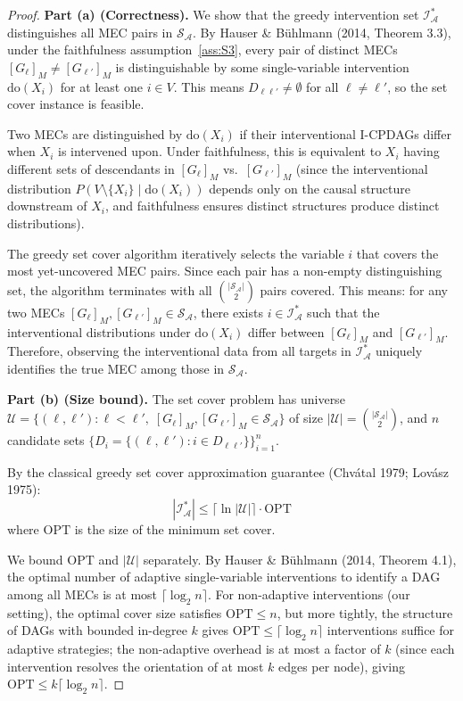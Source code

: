 \documentclass{article}
\theoremstyle{definition}
\theoremstyle{plain}
\theoremstyle{remark}
\begin{document}
\begin{proof}
\textbf{Part (a) (Correctness).}
We show that the greedy intervention set $\mathcal{I}^*_\mathcal{A}$ distinguishes all
MEC pairs in $\mathcal{S}_\mathcal{A}$. By Hauser \& Bühlmann (2014, Theorem 3.3),
under the faithfulness assumption~\ref{ass:S3}, every pair of distinct MECs $[G_\ell]_M
\neq [G_{\ell'}]_M$ is distinguishable by some single-variable intervention
$\mathrm{do}(X_i)$ for at least one $i \in V$. This means $D_{\ell\ell'} \neq \emptyset$
for all $\ell \neq \ell'$, so the set cover instance is feasible.

Two MECs are distinguished by $\mathrm{do}(X_i)$ if their interventional I-CPDAGs differ
when $X_i$ is intervened upon. Under faithfulness, this is equivalent to $X_i$ having
different sets of descendants in $[G_\ell]_M$ vs.\ $[G_{\ell'}]_M$ (since the interventional
distribution $P(V \setminus \{X_i\} \mid \mathrm{do}(X_i))$ depends only on the causal
structure downstream of $X_i$, and faithfulness ensures distinct structures produce
distinct distributions).

The greedy set cover algorithm iteratively selects the variable $i$ that covers the most
yet-uncovered MEC pairs. Since each pair has a non-empty distinguishing set, the algorithm
terminates with all $\binom{|\mathcal{S}_\mathcal{A}|}{2}$ pairs covered. This means:
for any two MECs $[G_\ell]_M, [G_{\ell'}]_M \in \mathcal{S}_\mathcal{A}$, there exists
$i \in \mathcal{I}^*_\mathcal{A}$ such that the interventional distributions under
$\mathrm{do}(X_i)$ differ between $[G_\ell]_M$ and $[G_{\ell'}]_M$. Therefore, observing
the interventional data from all targets in $\mathcal{I}^*_\mathcal{A}$ uniquely identifies
the true MEC among those in $\mathcal{S}_\mathcal{A}$.

\textbf{Part (b) (Size bound).}
The set cover problem has universe $\mathcal{U} = \{(\ell, \ell') : \ell < \ell',\;
[G_\ell]_M, [G_{\ell'}]_M \in \mathcal{S}_\mathcal{A}\}$ of size
$|\mathcal{U}| = \binom{|\mathcal{S}_\mathcal{A}|}{2}$, and $n$ candidate sets
$\{D_{i} = \{(\ell, \ell') : i \in D_{\ell\ell'}\}\}_{i=1}^n$.

By the classical greedy set cover approximation guarantee (Chvátal 1979; Lovász 1975):
\begin{equation}
  |\mathcal{I}^*_{\mathcal{A}}| \leq \lceil\ln |\mathcal{U}|\rceil \cdot \mathrm{OPT}
\end{equation}
where $\mathrm{OPT}$ is the size of the minimum set cover.

We bound $\mathrm{OPT}$ and $|\mathcal{U}|$ separately. By Hauser \& Bühlmann (2014,
Theorem 4.1), the optimal number of adaptive single-variable interventions to identify
a DAG among all MECs is at most $\lceil\log_2 n\rceil$. For non-adaptive interventions
(our setting), the optimal cover size satisfies $\mathrm{OPT} \leq n$, but more
tightly, the structure of DAGs with bounded in-degree $k$ gives
$\mathrm{OPT} \leq \lceil\log_2 n\rceil$ interventions suffice for adaptive
strategies; the non-adaptive overhead is at most a factor of $k$ (since each
intervention resolves the orientation of at most $k$ edges per node), giving
$\mathrm{OPT} \leq k \lceil\log_2 n\rceil$.


\end{proof}
\end{document}
